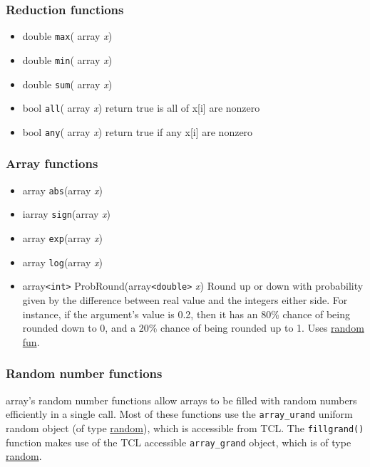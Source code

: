 \subsubsection{Reduction functions}

\begin{itemize}
\item double {\tt max}( array {\em x}) 
\item double {\tt min}( array {\em x}) 
\item double {\tt sum}( array {\em x}) 
\item bool {\tt all}( array {\em x}) 
  return true is all of x[i] are nonzero
\item bool {\tt any}( array {\em x})
  return true if any x[i] are nonzero
\end{itemize}

\subsubsection{Array functions}
\begin{itemize}
\item array {\tt abs}(array {\em x})
\item iarray {\tt sign}(array {\em x})
\item array {\tt exp}(array {\em x})
\item array {\tt log}(array {\em x})
\item array{\tt <int>} ProbRound(array{\tt <double>} {\em x})
    Round up or down with probability given by the difference between
    real value and the integers either side. For instance, if the
    argument's value is 0.2, then it has an 80\% chance of being
    rounded down to 0, and a 20\% chance of being rounded up to 1.
    Uses \hyperref{{\tt array\_urand}}{{\tt
    array\_urand}\S}{)}{random fun}.
\end{itemize}

\subsubsection{Random number functions}\label{random fun}

array's random number functions allow arrays to be filled with random
numbers efficiently in a single call. Most of these functions use the
\verb+array_urand+ uniform random object (of type \hyperref{urand}{urand\S}{)}{random}), which is
accessible from TCL. The \verb+fillgrand()+ function makes use of the
TCL accessible \verb+array_grand+ object, which is
of type \hyperref{gaussrand}{gaussrand\S}{)}{random}.


